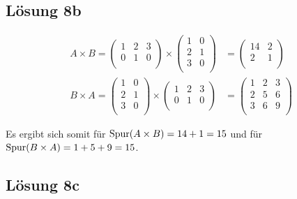 \documentclass[main.tex]{subfiles}
\begin{document}
\subsection{Lösung 8b}
\begin{align}
    A\times B = \begin{pmatrix}
        1 & 2 & 3 \\
        0 & 1 & 0 \\
    \end{pmatrix} \times \begin{pmatrix}
        1 & 0 \\
        2 & 1 \\
        3 & 0 \\
    \end{pmatrix} &= \begin{pmatrix}
        14 & 2 \\
        2 & 1 \\
    \end{pmatrix}\\
    B\times A = \begin{pmatrix}
        1 & 0 \\
        2 & 1 \\
        3 & 0 \\
    \end{pmatrix} \times \begin{pmatrix}
        1 & 2 & 3 \\
        0 & 1 & 0 \\
    \end{pmatrix} &= \begin{pmatrix}
            1 & 2 & 3 \\
            2 & 5 & 6 \\
            3 & 6 & 9 \\
    \end{pmatrix}
\end{align}

Es ergibt sich somit für $\operatorname{Spur} (A\times B) = 14 + 1 = 15$ und für $\operatorname{Spur} (B\times A) = 1 + 5 + 9 = 15$.

\subsection*{Lösung 8c}
\end{document}

